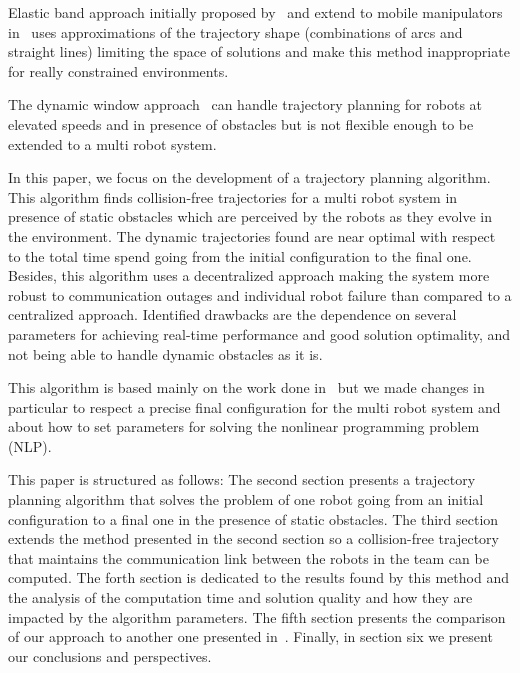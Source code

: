 \documentclass[eprint]{actapoly}
\begin{document}
 

Elastic band approach initially proposed by~\cite{Quinlan1994} and extend to 
mobile manipulators in~\cite{Brock et Khatib, 1998} uses approximations of the 
trajectory shape (combinations of arcs and straight lines) limiting the space 
of solutions and make this method inappropriate for really constrained 
environments.

 

The dynamic window approach~\cite{fox1997dynamic} can handle trajectory 
planning for robots at elevated speeds and in presence of obstacles but is not 
flexible enough to be extended to a multi robot system.

 


In this paper, we focus on the development of a trajectory planning algorithm. 
This algorithm finds collision-free trajectories for a multi robot system in 
presence of static obstacles which are perceived by the robots as they evolve 
in the environment. The dynamic trajectories found are near optimal with 
respect to the total time spend going from the initial configuration to the 
final one. Besides, this algorithm uses a decentralized approach making the 
system more robust to communication outages and individual robot failure than 
compared to a centralized approach. Identified drawbacks are the dependence on 
several parameters for achieving real-time performance and good solution 
optimality, and not being able to handle dynamic obstacles as it is.

 

This algorithm is based mainly on the work done in~\cite{Defoort2007a} but we 
made changes in particular to respect a precise final configuration for the 
multi robot system and about how to set parameters for solving the nonlinear 
programming problem (NLP).

 


This paper is structured as follows: The second section presents a trajectory 
planning algorithm that solves the problem of one robot going from an initial 
configuration to a final one in the presence of static obstacles. The third 
section extends the method presented in the second section so a collision-free 
trajectory that maintains the communication link between the robots in the 
team can be computed. The forth section is dedicated to the results found by 
this method and the analysis of the computation time and solution quality and 
how they are impacted by the algorithm parameters. The fifth section presents 
the comparison of our approach to another one presented in~\cite{}. Finally, in 
section six we present our conclusions and perspectives.
\end{document}

